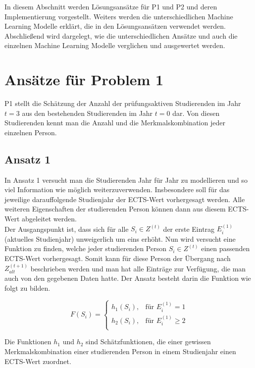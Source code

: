 

In diesem Abschnitt werden L\"osungsans\"atze f\"ur P1 und P2 und deren Implementierung vorgestellt.
Weiters werden die unterschiedlichen Machine Learning Modelle erkl\"art, die in den L\"osungsans\"atzen verwendet werden.
Abschlie{\ss}end wird dargelegt, wie die unterschiedlichen Ans\"atze und auch die einzelnen Machine Learning Modelle
verglichen und ausgewertet werden.

\section{Ans\"atze f\"ur Problem 1}
P1 stellt die Sch\"atzung der Anzahl der pr\"ufungsaktiven Studierenden im Jahr $t = 3$ aus den bestehenden Studierenden im Jahr $t = 0$ dar.
Von diesen Studierenden kennt man die Anzahl und die Merkmalskombination jeder einzelnen Person.

\subsection{Ansatz 1}
\label{sec:appr1}
In Ansatz 1 versucht man die Studierenden Jahr f\"ur Jahr zu modellieren und so viel Information wie m\"oglich weiterzuverwenden.
Insbesondere soll f\"ur das jeweilige darauffolgende Studienjahr der ECTS-Wert vorhergesagt werden. Alle weiteren Eigenschaften der studierenden Person
k\"onnen dann aus diesem ECTS-Wert abgeleitet werden. \\

Der Ausgangspunkt ist, dass sich für alle $S_i \in Z^{(t)}$ der erste Eintrag $E_i^{(1)}$ (aktuelles Studienjahr) unweigerlich um eins erhöht.
Nun wird versucht eine Funktion zu finden, welche jeder studierenden Person $S_i \in Z^{(t)}$ einen passenden ECTS-Wert vorhergesagt.
Somit kann f\"ur diese Person der \"Ubergang nach $Z_{alt}^{(t+1)}$ beschrieben werden und man hat alle Eintr\"age zur Verf\"ugung, die
man auch von den gegebenen Daten hatte. Der Ansatz besteht darin die Funktion wie folgt zu bilden.

$$
  F(S_i)=
  \left\{
  \begin{array}{lr}
    h_1(S_i), & \text{für }E_i^{(1)} = 1    \\
    h_2(S_i), & \text{für }E_i^{(1)} \geq 2 \\
  \end{array}
  \right.
$$

Die Funktionen $h_1$ und $h_2$ sind Sch\"atzfunktionen, die einer gewissen Merkmalskombination einer studierenden Person in einem Studienjahr einen
ECTS-Wert zuordnet. \\


